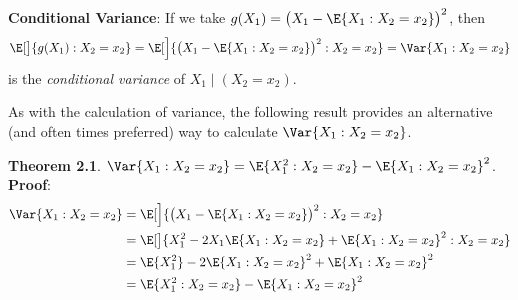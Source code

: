 \begin{Regular}
    \textbf{Conditional Variance}: If we take $ g(X_1)=\bigl(X_1-\E{X_1\given X_2=x_2}\bigr)^2 $, then
    \[ \E[\big]{g(X_1)\given X_2=x_2}=\E[\Big]{\bigl(X_1-\E{X_1\given X_2=x_2}\bigr)^2\given X_2=x_2}=\Var{X_1\given X_2=x_2} \]
    is the \emph{conditional variance} of $ X_1\mid (X_2=x_2) $.
\end{Regular}
As with the calculation of variance, the following result provides an alternative (and often times
preferred) way to calculate $ \Var{X_1\given X_2=x_2} $.
\begin{Result}
    \textbf{Theorem 2.1}. $ \Var{X_1\given X_2=x_2}=\E{X_1^2\given X_2=x_2}-\E{X_1\given X_2=x_2}^2 $.
    \tcblower{}
    \textbf{Proof}:
    \begin{align*}
        \Var{X_1\given X_2=x_2}
         & =\E[\Big]{\bigl(X_1-\E{X_1\given X_2=x_2}\bigr)^2\given X_2=x_2}                 \\
         & =\E[\big]{X_1^2-2X_1\E{X_1\given X_2=x_2}+\E{X_1\given X_2=x_2}^2\given X_2=x_2} \\
         & =\E{X_1^2}-2\E{X_1\given X_2=x_2}^2+\E{X_1\given X_2=x_2}^2                      \\
         & =\E{X_1^2\given X_2=x_2}-\E{X_1\given X_2=x_2}^2
    \end{align*}
\end{Result}

